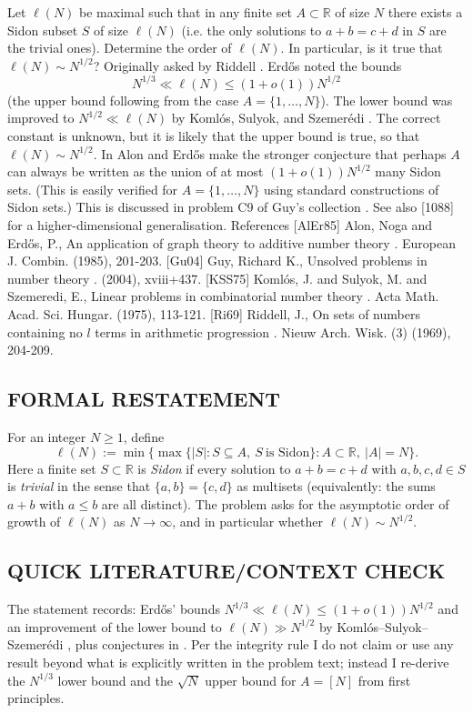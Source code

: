 Let $\ell(N)$ be maximal such that in any finite set $A\subset \mathbb{R}$ of size $N$ there exists a Sidon subset $S$ of size $\ell(N)$ (i.e. the only solutions to $a+b=c+d$ in $S$ are the trivial ones). Determine the order of $\ell(N)$. In particular, is it true that $\ell(N)\sim N^{1/2}$? Originally asked by Riddell \cite{Ri69}. Erd\H{o}s noted the bounds\[N^{1/3} \ll \ell(N) \leq (1+o(1))N^{1/2}\](the upper bound following from the case $A=\{1,\ldots,N\}$). The lower bound was improved to $N^{1/2}\ll \ell(N)$ by Koml\'{o}s, Sulyok, and Szemer\'{e}di \cite{KSS75}. The correct constant is unknown, but it is likely that the upper bound is true, so that $\ell(N)\sim N^{1/2}$. In \cite{AlEr85} Alon and Erd\H{o}s make the stronger conjecture that perhaps $A$ can always be written as the union of at most $(1+o(1))N^{1/2}$ many Sidon sets. (This is easily verified for $A=\{1,\ldots,N\}$ using standard constructions of Sidon sets.) This is discussed in problem C9 of Guy's collection \cite{Gu04}. See also [1088] for a higher-dimensional generalisation. References [AlEr85] Alon, Noga and Erd\H{o}s, P., An application of graph theory to additive number theory . European J. Combin. (1985), 201-203. [Gu04] Guy, Richard K., Unsolved problems in number theory . (2004), xviii+437. [KSS75] Koml\'{o}s, J. and Sulyok, M. and Szemeredi, E., Linear problems in combinatorial number theory . Acta Math. Acad. Sci. Hungar. (1975), 113-121. [Ri69] Riddell, J., On sets of numbers containing no $l$ terms in arithmetic progression . Nieuw Arch. Wisk. (3) (1969), 204-209.


\subsection*{FORMAL RESTATEMENT}
For an integer $N\ge 1$, define
\[
\ell(N):=\min\Big\{\max\{|S|:S\subseteq A,\ S\ \text{is Sidon}\}: A\subset\mathbb R,\ |A|=N\Big\}.
\]
Here a finite set $S\subset\mathbb R$ is \emph{Sidon} if every solution to $a+b=c+d$ with $a,b,c,d\in S$ is \emph{trivial} in the sense that $\{a,b\}=\{c,d\}$ as multisets (equivalently: the sums $a+b$ with $a\le b$ are all distinct).
The problem asks for the asymptotic order of growth of $\ell(N)$ as $N\to\infty$, and in particular whether $\ell(N)\sim N^{1/2}$.

\subsection*{QUICK LITERATURE/CONTEXT CHECK}
The statement records: Erd\H{o}s' bounds $N^{1/3} \ll \ell(N) \le (1+o(1))N^{1/2}$ and an improvement of the lower bound to $\ell(N)\gg N^{1/2}$ by Koml\'{o}s--Sulyok--Szemer\'{e}di \cite{KSS75}, plus conjectures in \cite{AlEr85}. Per the integrity rule I do not claim or use any result beyond what is explicitly written in the problem text; instead I re-derive the $N^{1/3}$ lower bound and the $\sqrt N$ upper bound for $A=[N]$ from first principles.

